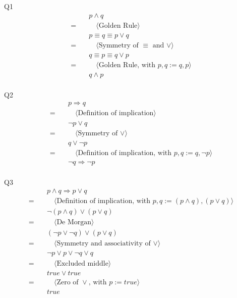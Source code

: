 \documentclass{article}
\begin{document}
    Q1
    \begin{align*}
        & \quad p \land q \\
        = & \quad\quad \langle \text{Golden Rule} \rangle \\
        & \quad p \equiv q \equiv p \vee q \\
        = & \quad\quad \langle \text{Symmetry of } \equiv \text{ and } \vee \rangle \\
        & \quad q \equiv p \equiv q \vee p \\
        = & \quad\quad \langle \text{Golden Rule, with } p,q := q,p \rangle \\
        & \quad q \land p \\
    \end{align*}

    \vspace{10mm}
    Q2
    \begin{align*}
        & \quad p \Longrightarrow q \\
        = & \quad\quad \langle \text{Definition of implication} \rangle \\
        & \quad \neg p \vee q  \\
        = & \quad\quad \langle \text{Symmetry of } \vee \rangle \\
        & \quad q \vee \neg p \\
        = & \quad\quad \langle \text{Definition of implication, with } p,q := q,\neg p \rangle \\
        & \quad \neg q \Longrightarrow \neg p \\
    \end{align*}

    \vspace{10mm}
    Q3
    \begin{align*}
        & \quad p \land q \Longrightarrow p \vee q \\
        = & \quad\quad \langle \text{Definition of implication, with } p,q := (p \land q),(p \vee q) \rangle \\
        & \quad \neg (p \land q) \vee (p \vee q)  \\
        = & \quad\quad \langle \text{De Morgan} \rangle \\
        & \quad (\neg p \vee \neg q) \vee (p \vee q) \\
        = & \quad\quad \langle \text{Symmetry and associativity of } \vee \rangle \\
        & \quad \neg p \vee p \vee \neg q \vee q \\
        = & \quad\quad \langle \text{Excluded middle} \rangle \\
        & \quad true \vee true \\
        = & \quad\quad \langle \text{Zero of } \vee \text{, with } p := true \rangle \\
        & \quad true \\
    \end{align*}
\end{document}
